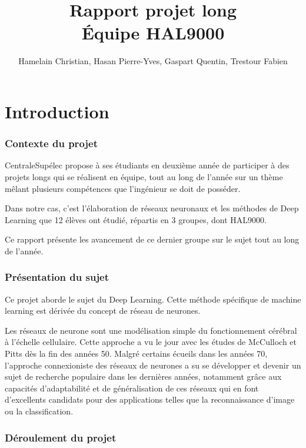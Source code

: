 \documentclass[a4paper,oneside]{report}
\title{Rapport projet long\\Équipe HAL9000}
\author{Hamelain Christian, Hasan Pierre-Yves, Gaspart Quentin, Trestour Fabien}
\begin{document}
    \setcounter{tocdepth}{1}


    \maketitle


    \tableofcontents


    \part{Introduction}

        \section[Contexte]{Contexte du projet}

            CentraleSupélec propose à  ses étudiants en deuxième année de participer
            à  des projets longs qui se réalisent en équipe, tout au long de l'année sur un thème mêlant plusieurs compétences que l'ingénieur se doit de posséder.

            Dans notre cas, c'est l'élaboration de réseaux neuronaux et les méthodes de Deep Learning que 12 élèves ont étudié, répartis en 3 groupes, dont HAL9000.

            Ce rapport présente les avancement de ce dernier groupe sur le sujet tout au long de l'année.


        \section{Présentation du sujet}

            Ce projet aborde le sujet du Deep Learning. Cette méthode spécifique de machine learning est dérivée du concept de réseau de neurones.

            Les réseaux de neurone sont une modélisation simple du fonctionnement cérébral
            à  l'échelle cellulaire. Cette approche a vu le jour avec les études de McCulloch et Pitts dès la fin des années 50. Malgré certains écueils dans les années 70, l'approche connexioniste des réseaux de neurones a su se développer et devenir un sujet de recherche populaire dans les dernières années, notamment grâce aux capacités d'adaptabilité et de généralisation de ces réseaux qui en font d'excellents candidats pour des applications telles que la reconnaissance d'image ou la classification.


        \section[Déroulement]{Déroulement du projet}
\end{document}
